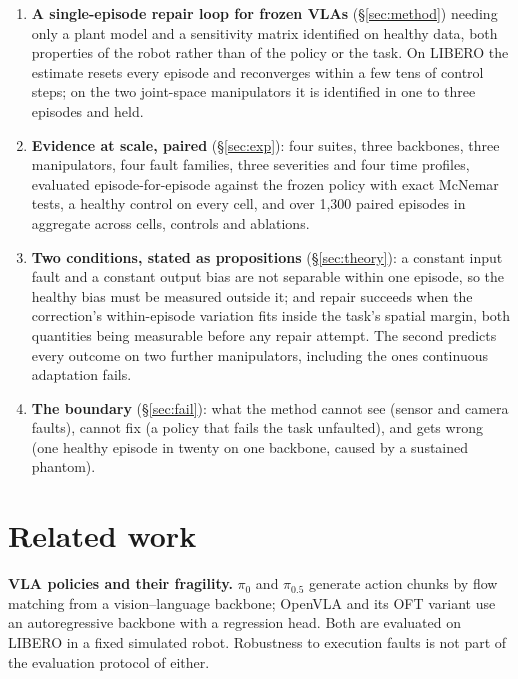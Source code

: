 \documentclass{article}
\begin{document}
\begin{enumerate}[leftmargin=1.5em,itemsep=1pt]
\item \textbf{A single-episode repair loop for frozen VLAs} (\S\ref{sec:method}) needing
  only a plant model and a sensitivity matrix identified on healthy data, both properties of
  the robot rather than of the policy or the task. On LIBERO the estimate resets every
  episode and reconverges within a few tens of control steps; on the two joint-space
  manipulators it is identified in one to three episodes and held.
\item \textbf{Evidence at scale, paired} (\S\ref{sec:exp}): four suites, three backbones, three
  manipulators, four fault families, three severities and four time profiles, evaluated
  episode-for-episode against the frozen policy with exact McNemar tests, a healthy
  control on every cell, and over 1,300 paired episodes in aggregate across cells, controls
  and ablations.
\item \textbf{Two conditions, stated as propositions} (\S\ref{sec:theory}): a constant input
  fault and a constant output bias are not separable within one episode, so the healthy
  bias must be measured outside it; and repair succeeds when the correction's
  within-episode variation fits inside the task's spatial margin, both quantities being
  measurable before any repair attempt. The second predicts every outcome on two further
  manipulators, including the ones continuous adaptation fails.
\item \textbf{The boundary} (\S\ref{sec:fail}): what the method cannot see (sensor and camera
  faults), cannot fix (a policy that fails the task unfaulted), and gets wrong (one healthy
  episode in twenty on one backbone, caused by a sustained phantom).
\end{enumerate}

\section{Related work}
\label{sec:related}

\textbf{VLA policies and their fragility.} $\pi_0$ and $\pi_{0.5}$ generate action chunks
by flow matching from a vision--language backbone; OpenVLA and its OFT variant use an
autoregressive backbone with a regression head. Both are evaluated on LIBERO in a fixed
simulated robot. Robustness to execution faults is not part of the evaluation protocol of
either.
\end{document}
